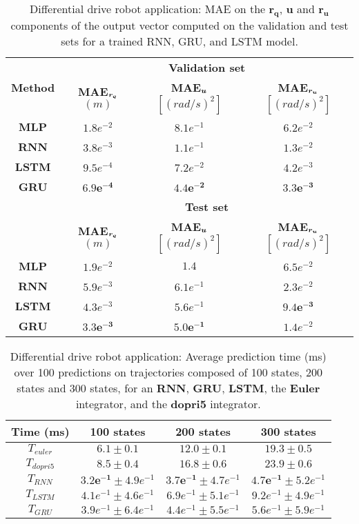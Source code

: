 \begin{table}[b!]
\centering
\begin{tabular}{ | c | c  c  c | }
\hline
    \multirow{2}{*}{\textbf{Method}} & \multicolumn{3}{c|}{\textbf{Validation set}} \\ \cline{2-4}
    & \textbf{MAE$_{\boldsymbol{r_q}}$} $(m)$  & \textbf{MAE$_{\boldsymbol{u}}$} $[(rad/s)^2]$ & \textbf{MAE$_{\boldsymbol{r_u}}$} $[(rad/s)^2]$ \\ \hline
{\textbf{MLP}} & $1.8e^{-2}$ & $8.1e^{-1}$ & $6.2e^{-2}$ \\ 
{\textbf{RNN}} & $3.8e^{-3}$ & $1.1e^{-1}$ & $1.3e^{-2}$ \\ 
{\textbf{LSTM}} & $9.5e^{-4}$ & $7.2e^{-2}$ & $4.2e^{-3}$ \\ 
{\textbf{GRU}} & $\boldsymbol{6.9e^{-4}}$ & $\boldsymbol{4.4e^{-2}}$ & $\boldsymbol{3.3e^{-3}}$ \\ 
\hline
    & \multicolumn{3}{c|}{\textbf{Test set}}\\ \cline{2-4}
    & \textbf{MAE$_{\boldsymbol{r_q}}$} $(m)$  & \textbf{MAE$_{\boldsymbol{u}}$} $[(rad/s)^2]$ & \textbf{MAE$_{\boldsymbol{r_u}}$} $[(rad/s)^2]$ \\ \hline
{\textbf{MLP}} & $1.9e^{-2}$ & $1.4$ & $6.5e^{-2}$ \\ 
{\textbf{RNN}} &  $5.9e^{-3}$ & $6.1e^{-1}$ & $2.3e^{-2}$ \\ 
{\textbf{LSTM}} & $4.3e^{-3}$ & $5.6e^{-1}$ & $\boldsymbol{9.4e^{-3}}$ \\ 
{\textbf{GRU}} & $\boldsymbol{3.3e^{-3}}$ & $5\boldsymbol{.0e^{-1}}$ & $1.4e^{-2}$ \\ 
\hline
\end{tabular}
\caption{
    Differential drive robot application: MAE on the $\boldsymbol{r_q}$, $\boldsymbol{u}$ and $\boldsymbol{r_u}$ components of the output vector computed on the validation and test sets for a trained RNN, GRU, and LSTM model.}
    \label{tab:NN_results_table_Q_unic}
\end{table}

\begin{table}[t]
\centering
\begin{tabular}{ | c | c  c  c | }
\hline
    \textbf{Time (ms)} & 100 states  & 200 states & 300 states \\ \hline
    $T_{euler}$ & $6.1 \pm 0.1$ & $12.0 \pm 0.1$ & $19.3 \pm 0.5$ \\ 
$T_{dopri5}$ & $8.5 \pm 0.4$ & $16.8 \pm 0.6$ & $23.9 \pm 0.6$ \\ 
$T_{RNN}$ & $\boldsymbol{3.2e^{-1}} \pm 4.9e^{-1}$ & $\boldsymbol{3.7e^{-1}} \pm 4.7e^{-1}$ & $\boldsymbol{4.7e^{-1}} \pm 5.2e^{-1}$ \\ 
$T_{LSTM}$ & $4.1e^{-1} \pm 4.6e^{-1}$ & $6.9e^{-1} \pm 5.1e^{-1}$ & $9.2e^{-1} \pm 4.9e^{-1}$ \\ 
$T_{GRU}$ & $3.9e^{-1} \pm 6.4e^{-1}$ & $4.4e^{-1} \pm 5.5e^{-1}$ & $5.6e^{-1} \pm 5.9e^{-1}$  \\ \hline
\end{tabular}
\caption{
    Differential drive robot application: Average prediction time (ms) over 100 predictions on trajectories composed of 100 states, 200 states and 300 states, for an \textbf{RNN}, \textbf{GRU}, \textbf{LSTM}, the \textbf{Euler} integrator, and the \textbf{dopri5} integrator.}
    \label{tab:timepred_unic}
\end{table}
